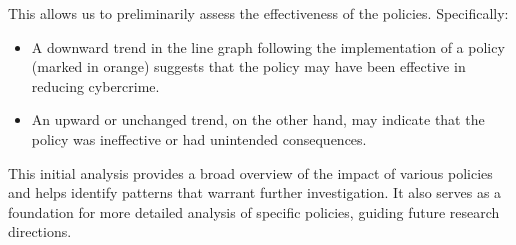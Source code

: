         This allows us to preliminarily assess the effectiveness of the policies.
        Specifically:
        \begin{itemize}
            \item A downward trend in the line graph following the implementation of a policy (marked in orange)
            suggests that the policy may have been effective in reducing cybercrime.
            \item An upward or unchanged trend, on the other hand,
            may indicate that the policy was ineffective or had unintended consequences.
        \end{itemize}
    
        This initial analysis provides a broad overview of the impact of various policies and
        helps identify patterns that warrant further investigation.
        It also serves as a foundation for more detailed analysis of specific policies, guiding future research directions.
    
